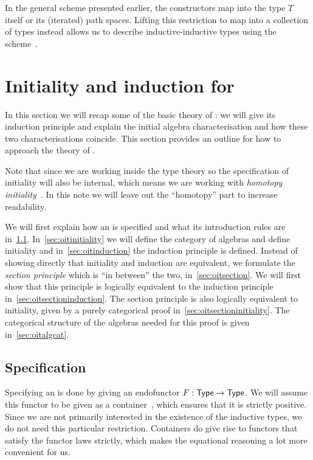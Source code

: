 \documentclass[a4paper,10pt]{article}
\begin{document}
In the general scheme presented earlier, the constructors map into the
type $T$ itself or its (iterated) path spaces. Lifting this
restriction to map into a collection of types instead allows us to
describe inductive-inductive types using the
scheme~\cite{Capriotti2014}.

\section{Initiality and induction for \oits}
\label{sec:oits}

In this section we will recap some of the basic theory of \oits: we
will give its induction principle and explain the initial algebra
characterisation and how these two characterisations coincide. This
section provides an outline for how to approach the theory of \hits.

Note that since we are working inside the type theory so the
specification of initiality will also be internal, which means we are
working with \emph{homotopy initiality}~\cite{Awodey2012}. In this
note we will leave out the ``homotopy'' part to increase readability.

We will first explain how an \oit is specified and what its
introduction rules are in~\cref{sec:oitspec}.
In~\cref{sec:oitinitiality} we will define the category of algebras and
define initiality and in~\cref{sec:oitinduction} the induction
principle is defined. Instead of showing directly that initiality and
induction are equivalent, we formulate the \emph{section principle}
which is ``in between'' the two, in~\cref{sec:oitsection}. We will
first show that this principle is logically equivalent to the
induction principle in~\cref{sec:oitsectioninduction}. The section
principle is also logically equivalent to initiality, given by a
purely categorical proof in~\cref{sec:oitsectioninitiality}. The
categorical structure of the algebras needed for this proof is given
in~\cref{sec:oitalgcat}.

\subsection{Specification}
\label{sec:oitspec}
Specifying an \oit is done by giving an endofunctor
$F : \mathsf{Type} \to \mathsf{Type}$. We will assume this functor to be given as a
container~\cite{Abbott2005}, which ensures that it is strictly
positive. Since we are not primarily interested in the existence of
the inductive types, we do not need this particular
restriction. Containers do give rise to functors that satisfy the
functor laws strictly, which makes the equational reasoning a lot more
convenient for us.
\end{document}

